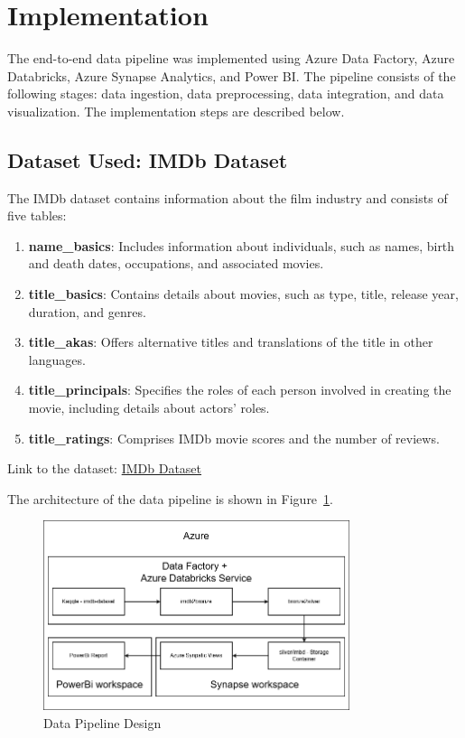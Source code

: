 \documentclass[a4paper,12pt]{article}
\begin{document}
\section{Implementation}
\label{sec:implementation}

The end-to-end data pipeline was implemented using Azure Data Factory, Azure Databricks, Azure Synapse Analytics, and Power BI. 
The pipeline consists of the following stages: data ingestion, data preprocessing, data integration, and data visualization. 
The implementation steps are described below.

\subsection{Dataset Used: IMDb Dataset}

The IMDb dataset contains information about the film industry and consists of five tables:
\begin{enumerate}
    \item \textbf{name\_basics}: Includes information about individuals, such as names, birth and death dates, occupations, and associated movies.
    \item \textbf{title\_basics}: Contains details about movies, such as type, title, release year, duration, and genres.
    \item \textbf{title\_akas}: Offers alternative titles and translations of the title in other languages.
    \item \textbf{title\_principals}: Specifies the roles of each person involved in creating the movie, including details about actors' roles.
    \item \textbf{title\_ratings}: Comprises IMDb movie scores and the number of reviews.
\end{enumerate}

Link to the dataset: \href{https://www.kaggle.com/datasets/ashirwadsangwan/imdb-dataset/data}{IMDb Dataset}

The architecture of the data pipeline is shown in Figure~\ref{fig:data_pipeline_design}.

\begin{figure}[H]
    \centering
    \includegraphics[width=0.8\textwidth]{../drawio/design.png}
    \caption{Data Pipeline Design}
    \label{fig:data_pipeline_design}
\end{figure}
\end{document}
